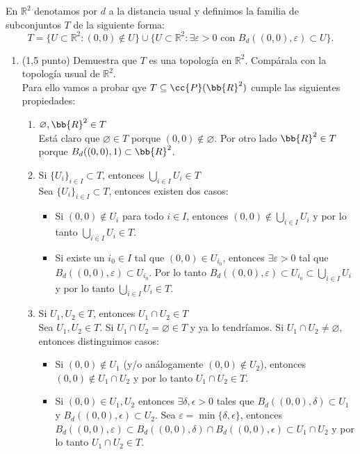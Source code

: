 \documentclass[12pt]{article}
\begin{document}
    \begin{ejercicio}
    En $\mathbb{R}^2$ denotamos por $d$ a la distancia usual y definimos la familia de subconjuntos $T$ de la siguiente forma:
    \[
        T = \{U \subset \mathbb{R}^2 : (0,0) \notin U\} \cup \{U \subset \mathbb{R}^2 : \exists \varepsilon > 0 \text{ con } B_d((0,0), \varepsilon) \subset U\}.
    \]
    \begin{enumerate}
        \item (1,5 punto) Demuestra que $T$ es una topología en $\mathbb{R}^2$. Compárala con la topología usual de $\mathbb{R}^2$.\\
        Para ello vamos a probar qye $T\subseteq \cc{P}(\bb{R}^2)$ cumple las siguientes propiedades:
        \begin{enumerate}
            \item[(A1)] $\varnothing, \bb{R}^2 \in T$\\
            Está claro que $\varnothing \in T$ porque $(0,0) \notin \varnothing$. Por otro lado $\bb{R}^2 \in T$ porque $B_d((0,0), 1) \subset \bb{R}^2$.
            \item[(A2)] Si $\{U_i\}_{i\in I} \subset T$, entonces $\bigcup_{i\in I} U_i \in T$\\
            Sea $\{U_i\}_{i\in I} \subset T$, entonces existen dos casos:
            \begin{itemize}
                \item Si $(0,0) \notin U_i$ para todo $i\in I$, entonces $(0,0) \notin \bigcup_{i\in I} U_i$ y por lo tanto $\bigcup_{i\in I} U_i \in T$.
                \item Si existe un $i_0\in I$ tal que $(0,0) \in U_{i_0}$, entonces $\exists \varepsilon > 0$ tal que $B_d((0,0), \varepsilon) \subset U_{i_0}$. Por lo tanto $B_d((0,0), \varepsilon) \subset U_{i_0} \subset \bigcup_{i\in I} U_i$ y por lo tanto $\bigcup_{i\in I} U_i \in T$.
            \end{itemize}
            \item[(A3)] Si $U_1, U_2 \in T$, entonces $U_1 \cap U_2 \in T$\\
            Sea $U_1, U_2 \in T$. Si $U_1\cap U_2 = \varnothing \in T$ y ya lo tendríamos. Si $U_1\cap U_2 \neq \varnothing$, entonces distinguimos casos:
            \begin{itemize}
                \item Si $(0,0)\notin U_1$ (y/o análogamente $(0,0)\notin U_2$), entonces $(0,0) \notin U_1\cap U_2$ y por lo tanto $U_1 \cap U_2 \in T$.
                \item Si $(0,0) \in U_1, U_2$ entonces $\exists \delta, \epsilon > 0$ tales que $B_d((0,0), \delta) \subset U_1$ y $B_d((0,0), \epsilon) \subset U_2$. Sea $\varepsilon = \min\{\delta, \epsilon\}$, entonces $B_d((0,0), \varepsilon) \subset B_d((0,0), \delta) \cap B_d((0,0), \epsilon) \subset U_1 \cap U_2$ y por lo tanto $U_1 \cap U_2 \in T$.

\end{itemize}
\end{enumerate}
\end{enumerate}
\end{ejercicio}
\end{document}
